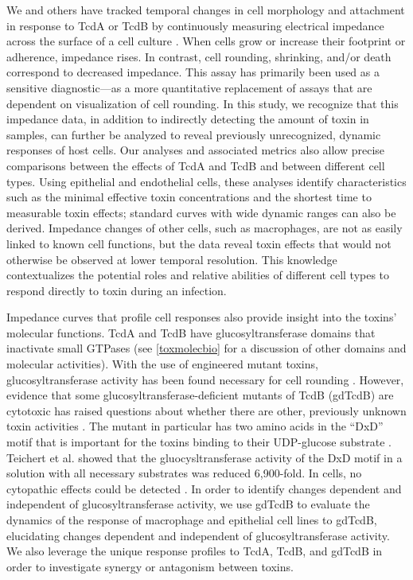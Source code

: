 We and others have tracked temporal changes in cell 
morphology and attachment in response to TcdA or TcdB 
by continuously measuring electrical impedance across 
the surface of a cell culture \cite{He:2009hg,Ryder:2010jo,DAuria:2013jo}. When cells 
grow or increase their footprint or adherence, impedance 
rises. In contrast, cell rounding, shrinking, and/or 
death correspond to decreased impedance. This assay 
has primarily been used as a sensitive diagnostic—as 
a more quantitative replacement of assays that are 
dependent on visualization of cell rounding. In 
this study, we recognize that this impedance data, 
in addition to indirectly detecting the amount of toxin 
in samples, can further be analyzed to reveal previously 
unrecognized, dynamic responses of host cells. Our analyses 
and associated metrics also allow precise comparisons 
between the effects of TcdA and TcdB and between different 
cell types. Using epithelial and endothelial cells, 
these analyses identify characteristics such as the minimal 
effective toxin concentrations and the shortest time to 
measurable toxin effects; standard curves with wide 
dynamic ranges can also be derived. Impedance changes 
of other cells, such as macrophages, are not as easily 
linked to known cell functions, but the data reveal toxin 
effects that would not otherwise be observed at lower 
temporal resolution. This knowledge contextualizes the 
potential roles and relative abilities of different cell 
types to respond directly to toxin during an infection. 

Impedance curves that profile cell responses also provide 
insight into the toxins' molecular functions. TcdA and 
TcdB have glucosyltransferase domains that inactivate small 
GTPases (see \ref{toxmolecbio} for a discussion of other domains and molecular activities). 
With the use of engineered mutant toxins, 
glucosyltransferase activity has been found necessary 
for cell rounding \cite{Teichert:2006jo}. However, evidence that some 
glucosyltransferase-deficient mutants of TcdB (gdTcdB) 
are cytotoxic has raised questions about whether there 
are other, previously unknown toxin activities \cite{Chumbler:2012co}. 
The mutant in particular has two amino acids in the ``DxD'' motif
that is important for the toxins binding to their UDP-glucose
substrate \cite{Teichert:2006jo}. Teichert et al. showed
that the gluocysltransferase activity of the DxD motif in
a solution with all necessary substrates was reduced 6,900-fold. 
In cells, no cytopathic effects could be detected \cite{Teichert:2006jo}.
In order to identify changes dependent and independent of 
glucosyltransferase activity, we use gdTcdB to evaluate 
the dynamics of the response of macrophage and epithelial 
cell lines to gdTcdB, elucidating changes dependent and 
independent of glucosyltransferase activity. We also 
leverage the unique response profiles to TcdA, TcdB, 
and gdTcdB in order to investigate synergy or antagonism 
between toxins.

